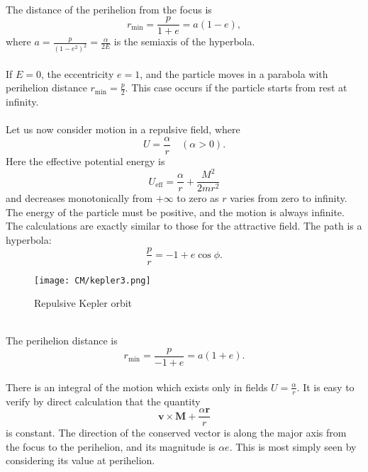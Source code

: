 \\
The distance of the perihelion from the focus is
\[r_{\mathrm{min}} = \frac{p}{1+e} = a(1-e),\]
where $a = \frac{p}{(1-e^2)^2} = \frac{\alpha}{2E}$ is the semiaxis of the hyperbola.
\\ \\
If $E = 0$, the eccentricity $e = 1$, and the particle moves in a parabola with perihelion distance $r_{\mathrm{min}} = \frac{p}{2}$. This case occurs if the particle starts from rest at infinity.
\\ \\
Let us now consider motion in a repulsive field, where
\[U= \frac{\alpha}{r} \quad (\alpha > 0).\]
Here the effective potential energy is
\[U_{\mathrm{eff}} = \frac{\alpha}{r} + \frac{M^2}{2mr^2} \]
and decreases monotonically from $+\infty$ to zero as $r$ varies from zero to infinity.
The energy of the particle must be positive, and the motion is always infinite. The calculations are exactly similar to those for the attractive field.
The path is a hyperbola:
\[\frac{p}{r} = -1 + e\cos\phi.\]
\begin{figure}[!h]
	\centering
	\texttt{[image: CM/kepler3.png]}
	\caption{Repulsive Kepler orbit}
\end{figure}
\\
The perihelion distance is
\[r_{\mathrm{min}} = \frac{p}{-1+e} = a(1+e).\]
\\
There is an integral of the motion which exists only in fields $U = \frac{\alpha}{r}$. 
It is easy to verify by direct calculation that the quantity
\[\bm{v}\times\bm{M} + \frac{\alpha \bm{r}}{r} \]
is constant. The direction of the conserved vector is along the major axis from the focus to the perihelion, and its magnitude is $\alpha e$. This is most simply seen by considering its value at perihelion.

